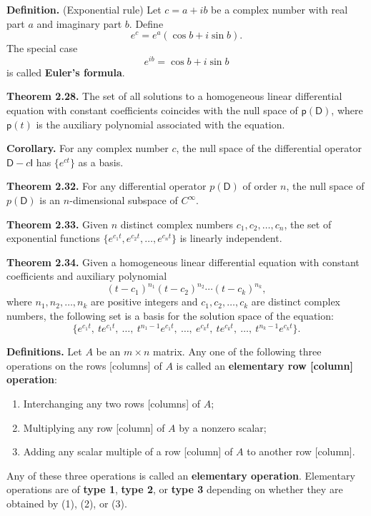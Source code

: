 \documentclass{article}
\newcommand{\0}{\mathit{0}}
\begin{document}
\textbf{Definition.} (Exponential rule) Let $c = a + ib$ be a complex number with real part $a$ and
imaginary part $b$. Define
\[
    e^c = e^a(\cos b + i \sin b).
\]
The special case
\[
    e^{ib} = \cos b + i \sin b
\]
is called \textbf{Euler's formula}.

\textbf{Theorem 2.28.} The set of all solutions to a homogeneous linear differential equation
with constant coefficients coincides with the null space of $\mathsf{p}(\mathsf{D})$,
where $\mathsf{p}(t)$ is the auxiliary polynomial associated with the equation.

\textbf{Corollary.} For any complex number $c$, the null space of the differential operator
$\mathsf{D} - c\mathsf{I}$ has $\{e^{ct}\}$ as a basis.

\textbf{Theorem 2.32.} For any differential operator $p(\mathsf{D})$ of order $n$,
the null space of $p(\mathsf{D})$ is an $n$-dimensional subspace of $C^\infty$.

\textbf{Theorem 2.33.} Given $n$ distinct complex numbers $c_1, c_2, \dots, c_n$,
the set of exponential functions $\{e^{c_1 t}, e^{c_2 t}, \dots, e^{c_n t}\}$ is linearly independent.

\textbf{Theorem 2.34.} Given a homogeneous linear differential equation with
constant coefficients and auxiliary polynomial
\[
    (t - c_1)^{n_1}(t - c_2)^{n_2} \cdots (t - c_k)^{n_k},
\]
where $n_1, n_2, \dots, n_k$ are positive integers and $c_1, c_2, \dots, c_k$ are distinct
complex numbers, the following set is a basis for the solution space of the equation:
\[
    \{e^{c_1 t},\ te^{c_1 t},\ \dots,\ t^{n_1 - 1}e^{c_1 t},\ \dots,\ e^{c_k t},\ te^{c_k t},\ \dots,\ t^{n_k - 1}e^{c_k t}\}.
\]

\medskip

\textbf{Definitions.} Let $A$ be an $m \times n$ matrix. Any one of the following three operations
on the rows [columns] of $A$ is called an \textbf{elementary row [column] operation}:
\begin{enumerate}
    \item Interchanging any two rows [columns] of $A$;
    \item Multiplying any row [column] of $A$ by a nonzero scalar;
    \item Adding any scalar multiple of a row [column] of $A$ to another row [column].
\end{enumerate}
Any of these three operations is called an \textbf{elementary operation}. Elementary operations
are of \textbf{type 1}, \textbf{type 2}, or \textbf{type 3} depending on whether they are obtained by (1), (2), or (3).
\end{document}

